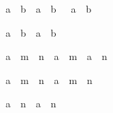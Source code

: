 \begin{isabellebody}
\begin{isamarkuptext}
\begin{isabelle}%
{\isacharparenleft}{\isasymbar}a{\isasymbar}\ {\isasymle}\ b{\isacharparenright}\ {\isacharequal}\ {\isacharparenleft}a\ {\isasymle}\ b\ {\isasymand}\ {\isacharminus}\ a\ {\isasymle}\ b{\isacharparenright}%
\end{isabelle}

\begin{isabelle}%
{\isasymbar}a\ {\isacharplus}\ b{\isasymbar}\ {\isasymle}\ {\isasymbar}a{\isasymbar}\ {\isacharplus}\ {\isasymbar}b{\isasymbar}%
\end{isabelle}

\begin{isabelle}%
a\ {\isacharcircum}\ {\isacharparenleft}m\ {\isacharplus}\ n{\isacharparenright}\ {\isacharequal}\ a\ {\isacharcircum}\ m\ {\isacharasterisk}\ a\ {\isacharcircum}\ n%
\end{isabelle}

\begin{isabelle}%
a\ {\isacharcircum}\ {\isacharparenleft}m\ {\isacharasterisk}\ n{\isacharparenright}\ {\isacharequal}\ {\isacharparenleft}a\ {\isacharcircum}\ m{\isacharparenright}\ {\isacharcircum}\ n%
\end{isabelle}

\begin{isabelle}%
{\isasymbar}a\ {\isacharcircum}\ n{\isasymbar}\ {\isacharequal}\ {\isasymbar}a{\isasymbar}\ {\isacharcircum}\ n%
\end{isabelle}
%
\end{isamarkuptext}%
\isamarkuptrue%
\isanewline
\isamarkupfalse%
\end{isabellebody}%
